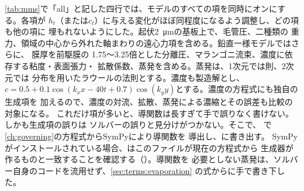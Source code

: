 \cref{tab:mms}で「all」と記した四行では、モデルのすべての項を同時にオンにする。各項が
$h_t$（または$c_t$）に与える変化がほぼ同程度になるよう調整し、どの項も他の項に
埋もれないようにした。起伏\SI{2}{\micro\metre}の基板上で、毛管圧、二種類の
重力、領域の中心から外れた軸まわりの遠心力項を含める。鉛直一様モデルではさらに、
膜厚を前駆膜の 1.75〜3.25倍とした分離圧、マランゴニ流束、濃度に依存する粘度・表面張力・
拡散係数、蒸発を含める。蒸発は、1次元では則、2次元では
分布を用いたラウールの法則とする。濃度も製造解とし、
$c = 0.5 + 0.1\cos(k_x x - 40t + 0.7)\cos(k_y y)$とする。濃度の方程式にも独自の生成項を
加えるので、濃度の対流、拡散、蒸発による濃縮とその誤差も比較の対象になる。
これだけ項が多いと、導関数は長すぎて手で誤りなく書けない。しかも生成項の誤りは
ソルバーの誤りと見分けがつかない。そこで、
で\cref{ch:governing}の方程式からSymPyにより導関数を
導出し、に書き出す。
SymPyがインストールされている場合、はこのファイルが現在の方程式から
生成器が作るものと一致することを確認する（）。導関数を
必要としない蒸発は、ソルバー自身のコードを流用せず、\cref{sec:terms:evaporation}
の式からに手で書き下した。

